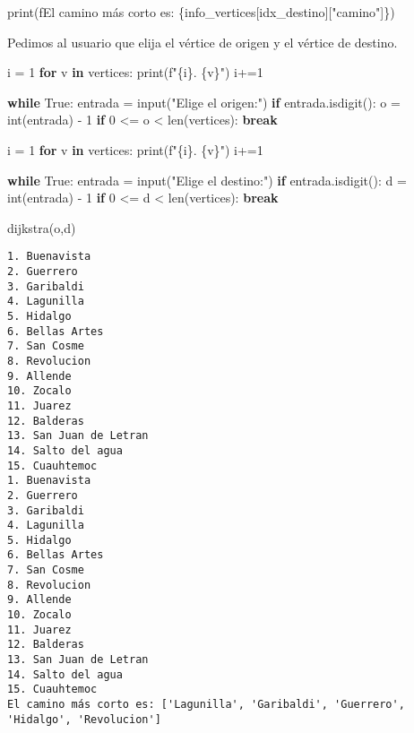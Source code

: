\documentclass[
]{article}
\newenvironment{Shaded}{}{}
\newcommand{\BuiltInTok}[1]{#1}
\newcommand{\ControlFlowTok}[1]{\textcolor[rgb]{0.00,0.44,0.13}{\textbf{#1}}}
\newcommand{\DecValTok}[1]{\textcolor[rgb]{0.25,0.63,0.44}{#1}}
\newcommand{\KeywordTok}[1]{\textcolor[rgb]{0.00,0.44,0.13}{\textbf{#1}}}
\newcommand{\NormalTok}[1]{#1}
\newcommand{\OperatorTok}[1]{\textcolor[rgb]{0.40,0.40,0.40}{#1}}
\newcommand{\SpecialCharTok}[1]{\textcolor[rgb]{0.25,0.44,0.63}{#1}}
\newcommand{\SpecialStringTok}[1]{\textcolor[rgb]{0.73,0.40,0.53}{#1}}
\newcommand{\StringTok}[1]{\textcolor[rgb]{0.25,0.44,0.63}{#1}}
\newcommand{\VariableTok}[1]{\textcolor[rgb]{0.10,0.09,0.49}{#1}}
\begin{document}
\begin{Shaded}
\begin{Highlighting}[]
  \BuiltInTok{print}\NormalTok{(}\SpecialStringTok{f\textquotesingle{}El camino más corto es: }\SpecialCharTok{\{}\NormalTok{info\_vertices[idx\_destino][}\StringTok{"camino"}\NormalTok{]}\SpecialCharTok{\}}\SpecialStringTok{\textquotesingle{}}\NormalTok{)}
\end{Highlighting}
\end{Shaded}

Pedimos al usuario que elija el vértice de origen y el vértice de
destino.

\begin{Shaded}
\begin{Highlighting}[]
\NormalTok{i }\OperatorTok{=} \DecValTok{1}
\ControlFlowTok{for}\NormalTok{ v }\KeywordTok{in}\NormalTok{ vertices:}
  \BuiltInTok{print}\NormalTok{(}\SpecialStringTok{f"}\SpecialCharTok{\{i\}}\SpecialStringTok{. }\SpecialCharTok{\{v\}}\SpecialStringTok{"}\NormalTok{)}
\NormalTok{  i}\OperatorTok{+=}\DecValTok{1}


\ControlFlowTok{while} \VariableTok{True}\NormalTok{:}
\NormalTok{  entrada }\OperatorTok{=} \BuiltInTok{input}\NormalTok{(}\StringTok{"Elige el origen:"}\NormalTok{)}
  \ControlFlowTok{if}\NormalTok{ entrada.isdigit():}
\NormalTok{    o }\OperatorTok{=} \BuiltInTok{int}\NormalTok{(entrada) }\OperatorTok{{-}} \DecValTok{1}  
    \ControlFlowTok{if} \DecValTok{0} \OperatorTok{\textless{}=}\NormalTok{ o }\OperatorTok{\textless{}} \BuiltInTok{len}\NormalTok{(vertices):}
      \ControlFlowTok{break}  

\NormalTok{i }\OperatorTok{=} \DecValTok{1}
\ControlFlowTok{for}\NormalTok{ v }\KeywordTok{in}\NormalTok{ vertices:}
  \BuiltInTok{print}\NormalTok{(}\SpecialStringTok{f"}\SpecialCharTok{\{i\}}\SpecialStringTok{. }\SpecialCharTok{\{v\}}\SpecialStringTok{"}\NormalTok{)}
\NormalTok{  i}\OperatorTok{+=}\DecValTok{1}

\ControlFlowTok{while} \VariableTok{True}\NormalTok{:}
\NormalTok{  entrada }\OperatorTok{=} \BuiltInTok{input}\NormalTok{(}\StringTok{"Elige el destino:"}\NormalTok{)}
  \ControlFlowTok{if}\NormalTok{ entrada.isdigit():}
\NormalTok{    d }\OperatorTok{=} \BuiltInTok{int}\NormalTok{(entrada) }\OperatorTok{{-}} \DecValTok{1}  
    \ControlFlowTok{if} \DecValTok{0} \OperatorTok{\textless{}=}\NormalTok{ d }\OperatorTok{\textless{}} \BuiltInTok{len}\NormalTok{(vertices):}
      \ControlFlowTok{break}  



\NormalTok{dijkstra(o,d)}
\end{Highlighting}
\end{Shaded}

\begin{verbatim}
1. Buenavista
2. Guerrero
3. Garibaldi
4. Lagunilla
5. Hidalgo
6. Bellas Artes
7. San Cosme
8. Revolucion
9. Allende
10. Zocalo
11. Juarez
12. Balderas
13. San Juan de Letran
14. Salto del agua
15. Cuauhtemoc
1. Buenavista
2. Guerrero
3. Garibaldi
4. Lagunilla
5. Hidalgo
6. Bellas Artes
7. San Cosme
8. Revolucion
9. Allende
10. Zocalo
11. Juarez
12. Balderas
13. San Juan de Letran
14. Salto del agua
15. Cuauhtemoc
El camino más corto es: ['Lagunilla', 'Garibaldi', 'Guerrero', 'Hidalgo', 'Revolucion']
\end{verbatim}
\end{document}
